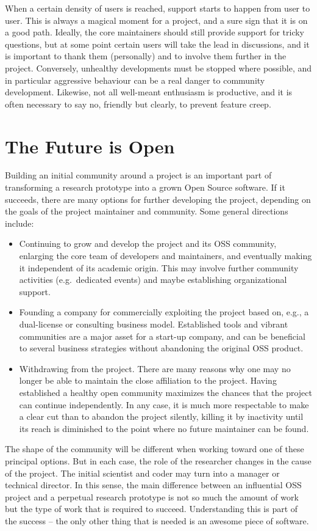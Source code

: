 When a certain density of users is reached, support starts to happen from user to user. This is always a magical moment for a project, and a sure sign that it is on a good path. Ideally, the core maintainers should still provide support for tricky questions, but at some point certain users will take the lead in discussions, and it is important to thank them (personally) and to involve them further in the project. Conversely, unhealthy developments must be stopped where possible, and in particular aggressive behaviour can be a real danger to community development. Likewise, not all well-meant enthusiasm is productive, and it is often necessary to say no, friendly but clearly, to prevent feature creep.

\section*{The Future is Open}

Building an initial community around a project is an important part of transforming a research prototype into a grown Open Source software. If it succeeds, there are many options for further developing the project, depending on the goals of the project maintainer and community. Some general directions include:
%
\begin{itemize}
\item Continuing to grow and develop the project and its OSS community, enlarging the core team of developers and maintainers, and eventually making it independent of its academic origin. This may involve further community activities (e.g.\ dedicated events) and maybe establishing organizational support.
%
\item Founding a company for commercially exploiting the project based on, e.g., a dual-license or consulting business model. Established tools and vibrant communities are a major asset for a start-up company, and can be beneficial to several business strategies without abandoning the original OSS product.
%
\item Withdrawing from the project. There are many reasons why one may no longer be able to maintain the close affiliation to the project. Having established a healthy open community maximizes the chances that the project can continue independently. In any case, it is much more respectable to make a clear cut than to abandon the project silently, killing it by inactivity until its reach is diminished to the point where no future maintainer can be found.
\end{itemize}
%
The shape of the community will be different when working toward one of these principal options. But in each case, the role of the researcher changes in the cause of the project. The initial scientist and coder may turn into a manager or technical director. In this sense, the main difference between an influential OSS project and a perpetual research prototype is not so much the amount of work but the type of work that is required to succeed. Understanding this is part of the success -- the only other thing that is needed is an awesome piece of software.
